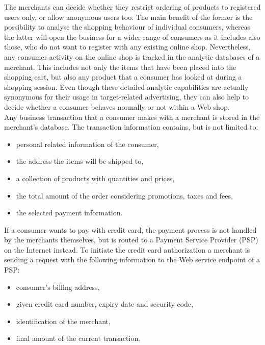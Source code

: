 The merchants can decide whether they restrict ordering of products to registered users only, or allow anonymous users too. The main benefit of the former is the possibility to analyse the shopping behaviour of individual consumers, whereas the latter will open the business for a wider range of consumers as it includes also those, who do not want to register with any existing online shop. Nevertheless, any consumer activity on the online shop is tracked in the analytic databases of a merchant. This includes not only the items that have been placed into the shopping cart, but also any product that a consumer has looked at during a shopping session. Even though these detailed analytic capabilities are actually synonymous for their usage in target-related advertising, they can also help to decide whether a consumer behaves normally or not within a Web shop. \\

Any business transaction that a consumer makes with a merchant is stored in the merchant’s database. The transaction information contains, but is not limited to:\@

\begin{itemize}
		\item personal related information of the consumer,
		\item the address the items will be shipped to,
		\item a collection of products with quantities and prices,
		\item the total amount of the order considering promotions, taxes and fees,
		\item the selected payment information.
\end{itemize}

If a consumer wants to pay with credit card, the payment process is not handled by the merchants themselves, but is routed to a Payment Service Provider (\gls{PSP}) on the Internet instead. To initiate the credit card authorization a merchant is sending a request with the following information to the Web service endpoint of a \gls{PSP}: \@

\begin{itemize}
    \item consumer's billing address,
    \item given credit card number, expiry date and security code,
    \item identification of the merchant,
    \item final amount of the current transaction.
\end{itemize}

